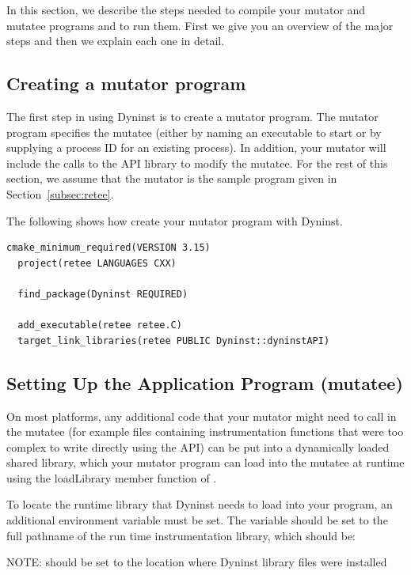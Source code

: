 In this section, we describe the steps needed to compile your mutator and mutatee programs and to run
them. First we give you an overview of the major steps and then we explain each one in detail.

\subsection{Creating a mutator program}

The first step in using Dyninst is to create a mutator program. The mutator program specifies the
mutatee (either by naming an executable to start or by supplying a process ID for an existing
process). In addition, your mutator will include the calls to the API library to modify the mutatee.
For the rest of this section, we assume that the mutator is the sample program given in
Section~\ref{subsec:retee}.

The following  shows how create your mutator program with Dyninst.

\begin{lstlisting}[language={}]
  cmake_minimum_required(VERSION 3.15)
  project(retee LANGUAGES CXX)

  find_package(Dyninst REQUIRED)

  add_executable(retee retee.C)
  target_link_libraries(retee PUBLIC Dyninst::dyninstAPI)
\end{lstlisting}

\subsection{Setting Up the Application Program (mutatee)}

On most platforms, any additional code that your mutator might need to call in the mutatee (for example
files containing instrumentation functions that were too complex to write directly using the API) can
be put into a dynamically loaded shared library, which your mutator program can load into the mutatee
at runtime using the loadLibrary member function of .

To locate the runtime library that Dyninst needs to load into your program, an additional environment
variable must be set. The variable  should be set to the full pathname of the
run time instrumentation library, which should be:


NOTE:  should be set to the location where Dyninst library files were installed

